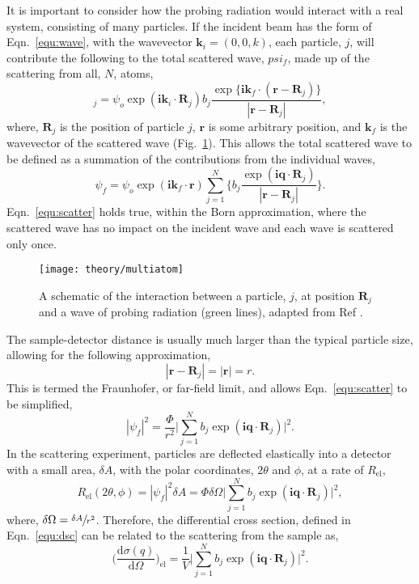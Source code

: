 It is important to consider how the probing radiation would interact with a real system, consisting of many particles.
If the incident beam has the form of Eqn.~\ref{equ:wave}, with the wavevector $\mathbf{k}_i = (0, 0, k)$, each particle, $j$, will contribute the following to the total scattered wave, $psi_f$, made up of the scattering from all, $N$, atoms,
%
\begin{equation}
	[\delta\psi_f]_j = \psi_o\exp{(\mathbf{ik}_i\cdot \mathbf{R}_j)}b_j\frac{\exp{\big\{\mathbf{ik}_f\cdot (\mathbf{r}-\mathbf{R}_j)\big\}}}{|\mathbf{r}-\mathbf{R}_j|},
\end{equation}
%
where, $\mathbf{R}_j$ is the position of particle $j$, $\mathbf{r}$ is some arbitrary position, and $\mathbf{k}_f$ is the wavevector of the scattered wave (Fig.~\ref{fig:multiatom}).
This allows the total scattered wave to be defined as a summation of the contributions from the individual waves,
%
\begin{equation}
	\psi_f = \psi_o \exp{(\mathbf{ik}_f\cdot\mathbf{r})}\sum_{j=1}^{N}\bigg\{b_j \frac{\exp{(\mathbf{iq}\cdot \mathbf{R}_j)}}{|\mathbf{r}-\mathbf{R}_j|}\bigg\}.
	\label{equ:scatter}
\end{equation}
%
Eqn.~\ref{equ:scatter} holds true, within the Born approximation, where the scattered wave has no impact on the incident wave and each wave is scattered only once.
%
\begin{figure}
	\centering
	\texttt{[image: theory/multiatom]}
	\caption{A schematic of the interaction between a particle, $j$, at position $\mathbf{R}_j$ and a wave of probing radiation (green lines), adapted from Ref \cite{Sivia2011}.}
	\label{fig:multiatom}
\end{figure}
%

The sample-detector distance is usually much larger than the typical particle size, allowing for the following approximation,
%
\begin{equation}
	|\mathbf{r} - \mathbf{R}_j| = |\mathbf{r}| = r.
\end{equation}
%
This is termed the Fraunhofer, or far-field limit, and allows Eqn.~\ref{equ:scatter} to be simplified,
%
\begin{equation}
	|\psi_f|^2 = \frac{\Phi}{r^2}\Bigg|\sum_{j=1}^{N}b_j\exp{(\mathbf{iq}\cdot\mathbf{R}_j)}\Bigg|^2.
\end{equation}
%
In the scattering experiment, particles are deflected elastically into a detector with a small area, $\delta A$, with the polar coordinates, $2\theta$ and $\phi$, at a rate of $R_{\text{el}}$,
%
\begin{equation}
	R_{\text{el}}(2\theta,\phi) = |\psi_f|^2\delta A = \Phi\delta\Omega\Bigg|\sum_{j=1}^{N}b_j\exp{(\mathbf{iq}\cdot\mathbf{R}_j)}\Bigg|^2,
\end{equation}
%
where, $\delta\Omega = \sfrac{\delta A}{r^2}$.
Therefore, the differential cross section, defined in Eqn.~\ref{equ:dsc} can be related to the scattering from the sample as,
%
\begin{equation}
	\bigg(\frac{\text{d}\sigma(q)}{\text{d}\Omega}\bigg)_{\text{el}} = \frac{1}{V} \Bigg|\sum_{j=1}^{N}b_j\exp{(\mathbf{iq}\cdot\mathbf{R}_j)}\Bigg|^2.
	\label{equ:sca}
\end{equation}
%

